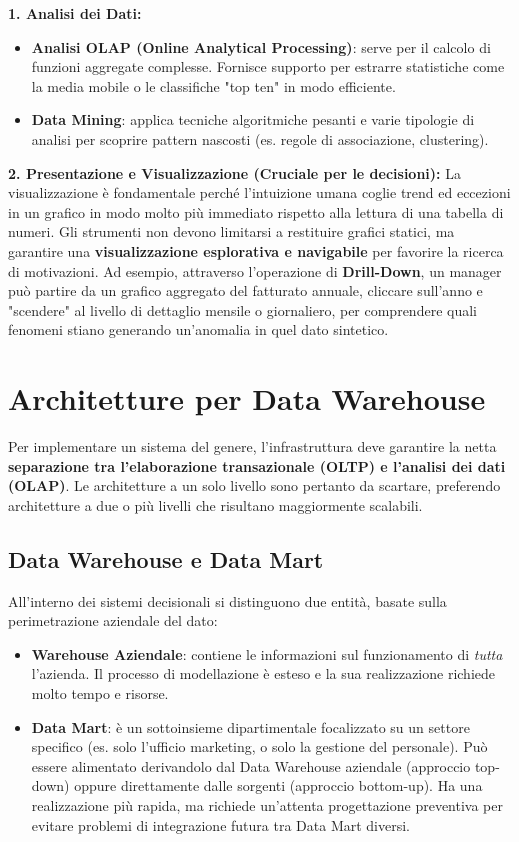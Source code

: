 \textbf{1. Analisi dei Dati:}
\begin{itemize}
\item \textbf{Analisi OLAP (Online Analytical Processing)}: serve per il calcolo di funzioni aggregate complesse. Fornisce supporto per estrarre statistiche come la media mobile o le classifiche "top ten" in modo efficiente.
\item \textbf{Data Mining}: applica tecniche algoritmiche pesanti e varie tipologie di analisi per scoprire pattern nascosti (es. regole di associazione, clustering).
\end{itemize}

\textbf{2. Presentazione e Visualizzazione (Cruciale per le decisioni):}
La visualizzazione è fondamentale perché l'intuizione umana coglie trend ed eccezioni in un grafico in modo molto più immediato rispetto alla lettura di una tabella di numeri.
Gli strumenti non devono limitarsi a restituire grafici statici, ma garantire una \textbf{visualizzazione esplorativa e navigabile} per favorire la ricerca di motivazioni.
Ad esempio, attraverso l'operazione di \textbf{Drill-Down}, un manager può partire da un grafico aggregato del fatturato annuale, cliccare sull'anno e "scendere" al livello di dettaglio mensile o giornaliero, per comprendere quali fenomeni stiano generando un'anomalia in quel dato sintetico.

\section{Architetture per Data Warehouse}

Per implementare un sistema del genere, l'infrastruttura deve garantire la netta \textbf{separazione tra l'elaborazione transazionale (OLTP) e l'analisi dei dati (OLAP)}. Le architetture a un solo livello sono pertanto da scartare, preferendo architetture a due o più livelli che risultano maggiormente scalabili.

\subsection{Data Warehouse e Data Mart}
All'interno dei sistemi decisionali si distinguono due entità, basate sulla perimetrazione aziendale del dato:
\begin{itemize}
\item \textbf{Warehouse Aziendale}: contiene le informazioni sul funzionamento di \textit{tutta} l'azienda. Il processo di modellazione è esteso e la sua realizzazione richiede molto tempo e risorse.
\item \textbf{Data Mart}: è un sottoinsieme dipartimentale focalizzato su un settore specifico (es. solo l'ufficio marketing, o solo la gestione del personale). Può essere alimentato derivandolo dal Data Warehouse aziendale (approccio top-down) oppure direttamente dalle sorgenti (approccio bottom-up). Ha una realizzazione più rapida, ma richiede un'attenta progettazione preventiva per evitare problemi di integrazione futura tra Data Mart diversi.
\end{itemize}

